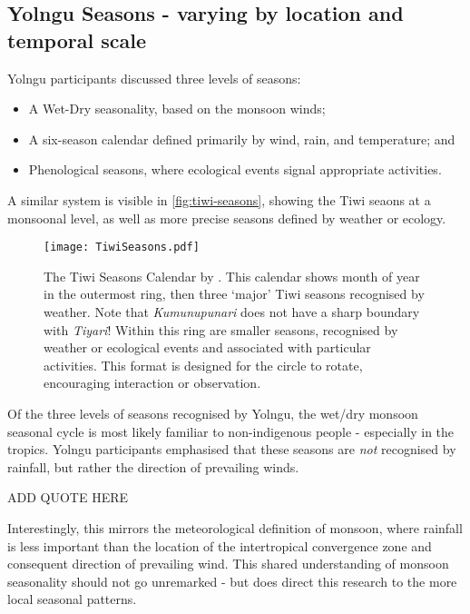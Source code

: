 \subsection{Yolngu Seasons - varying by location and temporal scale}

Yolngu participants discussed three levels of seasons:
\begin{itemize}
\item A Wet-Dry seasonality, based on the monsoon winds;
\item A six-season calendar defined primarily by wind, rain, and temperature; and
\item Phenological seasons, where ecological events signal appropriate activities.
\end{itemize}

A similar system is visible in \autoref{fig:tiwi-seasons}, showing the Tiwi seaons at
a monsoonal level, as well as more precise seasons defined by weather or ecology.


\begin{landscape}
\begin{figure}[p]
    \centering
    \texttt{[image: TiwiSeasons.pdf]}
    \caption[The Tiwi Seasons Calendar by \citet{CSIROcals}]{
        The Tiwi Seasons Calendar by \citet{CSIROcals}.
        This calendar shows month of year in the outermost ring,
        then three `major' Tiwi seasons recognised by weather.
        Note that \textit{Kumunupunari} does not have a sharp boundary with \textit{Tiyari}!
        Within this ring are smaller seasons, recognised by weather
        or ecological events and associated with particular activities.
        This format is designed for the circle to rotate, encouraging interaction or observation.
        }
    \label{fig:tiwi-seasons}
\end{figure}
\end{landscape}


Of the three levels of seasons recognised by Yolngu,
the wet/dry monsoon seasonal cycle is most likely familiar to non-indigenous people -
especially in the tropics.  Yolngu participants emphasised that these seasons
are \emph{not} recognised by rainfall, but rather the direction of prevailing winds.

ADD QUOTE HERE

Interestingly, this mirrors the meteorological definition of monsoon, where rainfall is less important than
the location of the intertropical convergence zone and consequent direction of prevailing wind.
This shared understanding of monsoon seasonality should not go unremarked -
but does direct this research to the more local seasonal patterns.


